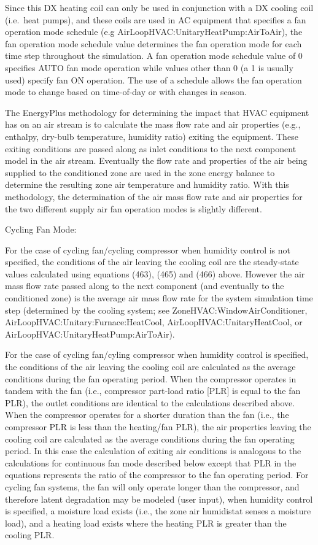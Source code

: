 Since this DX heating coil can only be used in conjunction with a DX cooling coil (i.e.~heat pumps), and these coils are used in AC equipment that specifies a fan operation mode schedule (e.g AirLoopHVAC:UnitaryHeatPump:AirToAir), the fan operation mode schedule value determines the fan operation mode for each time step throughout the simulation. A fan operation mode schedule value of 0 specifies AUTO fan mode operation while values other than 0 (a 1 is usually used) specify fan ON operation. The use of a schedule allows the fan operation mode to change based on time-of-day or with changes in season.

The EnergyPlus methodology for determining the impact that HVAC equipment has on an air stream is to calculate the mass flow rate and air properties (e.g., enthalpy, dry-bulb temperature, humidity ratio) exiting the equipment. These exiting conditions are passed along as inlet conditions to the next component model in the air stream. Eventually the flow rate and properties of the air being supplied to the conditioned zone are used in the zone energy balance to determine the resulting zone air temperature and humidity ratio. With this methodology, the determination of the air mass flow rate and air properties for the two different supply air fan operation modes is slightly different.

Cycling Fan Mode:

For the case of cycling fan/cycling compressor when humidity control is not specified, the conditions of the air leaving the cooling coil are the steady-state values calculated using equations (463), (465) and (466) above. However the air mass flow rate passed along to the next component (and eventually to the conditioned zone) is the average air mass flow rate for the system simulation time step (determined by the cooling system; see ZoneHVAC:WindowAirConditioner, AirLoopHVAC:Unitary:Furnace:HeatCool, AirLoopHVAC:UnitaryHeatCool, or AirLoopHVAC:UnitaryHeatPump:AirToAir).

For the case of cycling fan/cyling compressor when humidity control is specified, the conditions of the air leaving the cooling coil are calculated as the average conditions during the fan operating period. When the compressor operates in tandem with the fan (i.e., compressor part-load ratio {[}PLR{]} is equal to the fan PLR), the outlet conditions are identical to the calculations described above. When the compressor operates for a shorter duration than the fan (i.e., the compressor PLR is less than the heating/fan PLR), the air properties leaving the cooling coil are calculated as the average conditions during the fan operating period. In this case the calculation of exiting air conditions is analogous to the calculations for continuous fan mode described below except that PLR in the equations represents the ratio of the compressor to the fan operating period. For cycling fan systems, the fan will only operate longer than the compressor, and therefore latent degradation may be modeled (user input), when humidity control is specified, a moisture load exists (i.e., the zone air humidistat senses a moisture load), and a heating load exists where the heating PLR is greater than the cooling PLR.

